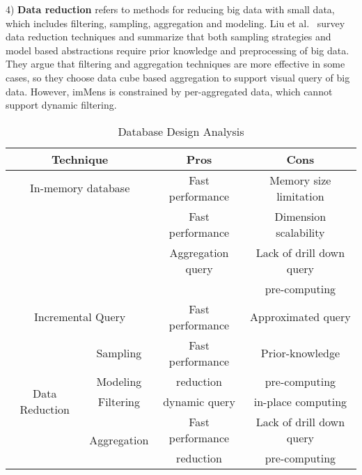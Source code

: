 4) \textbf{Data reduction} refers to methods for reducing big data with small data, which includes filtering, sampling, aggregation and modeling. 
Liu et al.~\cite{2013-immens} survey data reduction techniques and summarize that both sampling strategies and model based abstractions require prior knowledge and preprocessing of big data. They argue that filtering and aggregation techniques are more effective in some cases, so they choose data cube based aggregation to support  visual query of big data. However, imMens is constrained by per-aggregated data, which cannot support dynamic  filtering. 


\begin{table}[ht]
	\small
	\caption{Database Design Analysis}
	\begin{center}
		\begin{tabular}{|cc|c|c|}
			\hline
			\multicolumn{2}{|c|}{\textbf{Technique}} & \textbf{Pros} & \textbf{Cons} \\
			\hline
			\multicolumn{2}{|c|}{In-memory database} & Fast performance & Memory size limitation\\
			\hline
			
			\multicolumn{2}{|c|}{	\multirow{3}{*}{Data cube} }& Fast performance  & Dimension scalability\\
			& & Aggregation query  & Lack of drill down query \\
			& & & pre-computing\\
			\hline
			
			
			
			\multicolumn{2}{|c|}{Incremental Query} & Fast performance & Approximated query\\
			\hline
			
			
			\multicolumn{1}{|c|}{\multirow{5}{*}{Data Reduction}}& Sampling & Fast performance  & Prior-knowledge\\ 
			& \multicolumn{1}{|c|}{Modeling}  & reduction & pre-computing \\  
			\cline{2-4}
			& \multicolumn{1}{|c|}{Filtering} & dynamic query & in-place computing\\ 
			\cline{2-4}
			& \multicolumn{1}{|c|}{\multirow{2}{*}{Aggregation}} & Fast performance & Lack of drill down query\\
			& \multicolumn{1}{|c|}{} & reduction  & pre-computing\\
			\hline
			
			
			\hline
		\end{tabular}
	\end{center}
	\label{tab:database}
\end{table}




